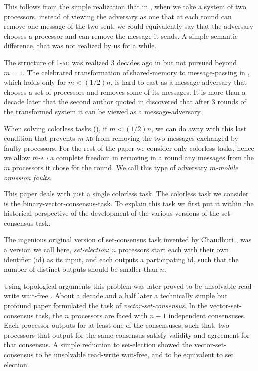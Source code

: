 \documentclass[11pt]{article}
\newcommand{\mAD}{{\textit{m-}\textsc{ad}}\xspace}
\newcommand{\oAD}{{{\small 1-}\textsc{ad}}\xspace}
\begin{document}
This follows from the simple realization that in \cite{AG15}, when we take a system of two processors, instead of viewing
the adversary as one that at each round can remove one message of the two sent, we could equivalently say that the adversary chooses a processor and can remove
the message it sends. A simple semantic difference, that was not realized by us for a while.

The structure of \oAD was realized 3 decades ago in \cite{Healer} but not pursued beyond $m=1$.
The celebrated transformation of shared-memory to message-passing in \cite{ABD90,ABD95}, which holds only for $m<(1/2)n$,
is hard to cast as a message-adversary that chooses a set of processors and removes some of its messages.
It is more than a decade later that the second author quoted in \cite{983102} discovered that after 3 rounds of the transformed
system it can be viewed as a message-adversary.


When solving colorless tasks (\cite{BGLR}), if $m<(1/2)n$, we can do away with this last condition that prevents \mAD from removing the two messages exchanged by faulty processors. 
For the rest of the paper we consider only colorless tasks, hence we allow \mAD a complete freedom in removing in a round any messages from the $m$ processors it chose for the round. We call this type of adversary \emph{$m$-mobile omission faults}.


This paper deals with just a single colorless task. The colorless task we consider  is the binary-vector-consensus-task.
To explain this task we first put it within the historical perspective of the development of the various versions of the set-consensus task.

The ingenious original version of set-consensus task invented by Chaudhuri \cite{SC}, was
a version we call here, \emph{set-election}: $n$ processors start each with their own identifier (id) as its input,
and each outputs a participating id, such that the number of distinct outputs should be smaller than $n$.


Using topological arguments this problem was later proved to be unsolvable read-write wait-free \cite{BG,HS,SZ}.
About a decade and a half later a technically simple but profound
paper \cite{VSC} formulated the task of \emph{vector-set-consensus}. In the vector-set-consensus task,
the $n$ processors are faced with $n-1$ independent consensuses. Each processor outputs for at least one of the consensuses,
such that, two processors that output for the same consensus satisfy validity and agreement for that consensus.
A simple reduction to set-election showed the vector-set-consensus to be unsolvable read-write wait-free,
and to be equivalent to set election.
\end{document}
